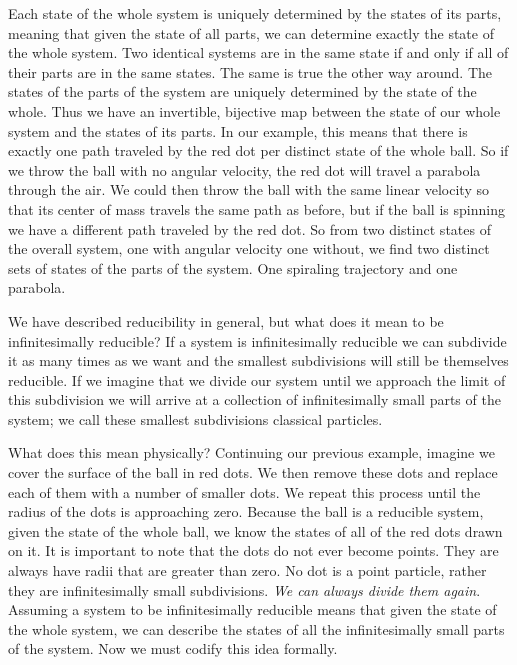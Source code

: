 \documentclass{article}[a4paper]
\begin{document}
	Each state of the whole system is uniquely determined by the states of its parts, meaning that given the state of all parts, we can determine exactly the state of the whole system. Two identical systems are in the same state if and only if all of their parts are in the same states. The same is true the other way around. The states of the parts of the system are uniquely determined by the state of the whole. Thus we have an invertible, bijective map between the state of our whole system and the states of its parts. In our example, this means that there is exactly one path traveled by the red dot per distinct state of the whole ball. So if we throw the ball with no angular velocity, the red dot will travel a parabola through the air. We could then throw the ball with the same linear velocity so that its center of mass travels the same path as before, but if the ball is spinning we have a different path traveled by the red dot. So from two distinct states of the overall system, one with angular velocity one without, we find two distinct sets of states of the parts of the system. One spiraling trajectory and one parabola.
		
	 
	 
	 We have described reducibility in general, but what does it mean to be infinitesimally reducible? If a system is infinitesimally reducible we can subdivide it as many times as we want and the smallest subdivisions will still be themselves reducible. If we imagine that we divide our system until we approach the limit of this subdivision we will arrive at a collection of infinitesimally small parts of the system; we call these smallest subdivisions classical particles.
	 
	 What does this mean physically? Continuing our previous example, imagine we cover the surface of the ball in red dots. We then remove these dots and replace each of them with a number of smaller dots. We repeat this process until the radius of the dots is approaching zero. Because the ball is a reducible system, given the state of the whole ball, we know the states of all of the red dots drawn on it. It is important to note that the dots do not ever become points. They are always have radii that are greater than zero. No dot is a point particle, rather they are infinitesimally small subdivisions. \textit{We can always divide them again}. Assuming a system to be infinitesimally reducible means that given the state of the whole system, we can describe the states of all the infinitesimally small parts of the system. Now we must codify this idea formally.
	 	
\end{document}
